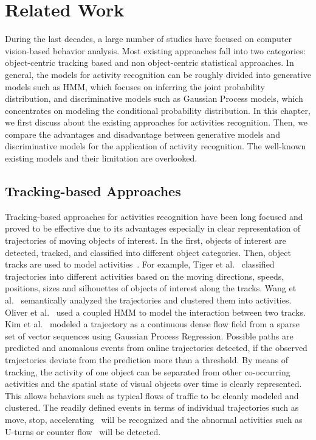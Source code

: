 \chapter{Related Work}
\label{chap:relatedwork}
During the last decades, a large number of studies have focused on computer vision-based behavior analysis. Most existing approaches fall into two categories: object-centric tracking based and non object-centric statistical approaches. 
In general, the models for activity recognition can be roughly divided into generative models such as HMM, which focuses on inferring the joint probability distribution, and discriminative models such as Gaussian Process models, which concentrates on modeling the conditional probability distribution.
In this chapter, we first discuss about the existing approaches for activities recognition. Then, we compare the advantages and disadvantage between generative models and discriminative models for the application of activity recognition. The well-known existing models and their limitation are overlooked. 


\section{Tracking-based Approaches}
\label{related:tracking}
Tracking-based approaches for activities recognition have been long focused and proved to be effective due to its advantages especially in clear representation of trajectories of moving objects of interest. 
In the first, objects of interest are detected, tracked, and classified  into different object categories. Then, object tracks are used to model activities~\cite{kim2011gaussian, wang2011trajectory, Oliver_tracking_based, wang2014abnormal, aggarwal2011human, tiger2014towards}. 
For example, Tiger et al.~\cite{tiger2014towards} classified trajectories into different activities based on the moving directions, speeds, positions, sizes and silhouettes of objects of interest along the tracks. 
Wang et al.~\cite{wang2011trajectory} semantically analyzed the trajectories and clustered them into activities. 
Oliver et al.~\cite{Oliver_tracking_based} used a coupled HMM to model the interaction between two tracks. 
Kim et al.~\cite{kim2011gaussian} modeled a trajectory as a continuous dense flow field from a sparse set of vector sequences using Gaussian Process Regression. Possible paths are predicted and anomalous events from online trajectories detected, if the observed trajectories deviate from the prediction more than a threshold.
By means of tracking, the activity of one object can be separated from other co-occurring activities and the spatial state of visual objects over time is clearly represented. This allows behaviors such as typical flows of traffic to be cleanly modeled and clustered. The readily defined events in terms of individual trajectories such as move, stop, accelerating~\cite{kim2011gaussian} will be recognized and the abnormal activities such as U-turns or counter flow~\cite{berclaz2008multi} will be detected.

